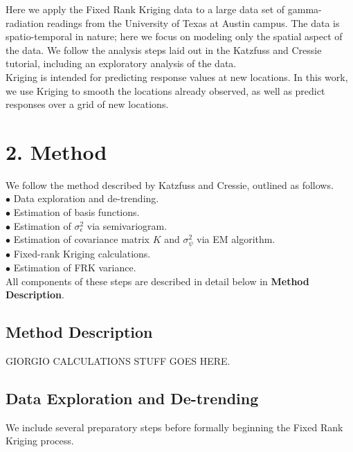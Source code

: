 \documentclass[11pt]{article}
\begin{document}
Here we apply the Fixed Rank Kriging data to a large data set of gamma-radiation readings from the University of Texas at Austin campus.  The data is spatio-temporal in nature; here we focus on modeling only the spatial aspect of the data.  We follow the analysis steps laid out in the Katzfuss and Cressie tutorial, including an exploratory analysis of the data. \\

Kriging is intended for predicting response values at new locations.  In this work, we use Kriging to smooth the locations already observed, as well as predict responses over a grid of new locations. \\

\newpage
\section{2. Method}

We follow the method described by Katzfuss and Cressie, outlined as follows. \\
$\bullet$ Data exploration and de-trending. \\
$\bullet$ Estimation of basis functions. \\
$\bullet$ Estimation of $\sigma^2_\epsilon$ via semivariogram. \\
$\bullet$ Estimation of covariance matrix $K$ and $\sigma^2_\psi$ via EM algorithm. \\
$\bullet$ Fixed-rank Kriging calculations. \\
$\bullet$ Estimation of FRK variance. \\

All components of these steps are described in detail below in \textbf{Method Description}. \\


\subsection{Method Description}

GIORGIO CALCULATIONS STUFF GOES HERE.\\

\subsection{Data Exploration and De-trending}
We include several preparatory steps before formally beginning the Fixed Rank Kriging process.\\
\end{document}
